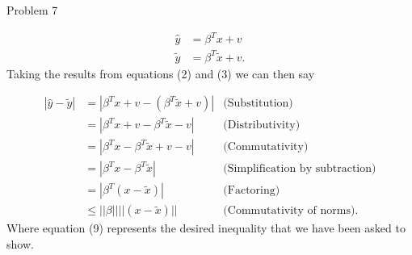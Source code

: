 \begin{problem}{Problem 7}
\begin{Highlight}[Solution]
        \begin{align}
            \hat{y} & = \beta^{T}x + v \\
            \tilde{y} & = \beta^{T}\tilde{x} + v.
        \end{align}
        Taking the results from equations (2) and (3) we can then say 

        \begin{align}
            |\hat{y} - \tilde{y}| & = |\beta^{T}x + v - (\beta^{T}\tilde{x} + v)| & \text{(Substitution)} \\
            & = |\beta^{T}x + v - \beta^{T}\tilde{x} - v| & \text{(Distributivity)} \\
            & = |\beta^{T}x - \beta^{T}\tilde{x} + v - v| & \text{(Commutativity)} \\
            & = |\beta^{T}x - \beta^{T}\tilde{x}| & \text{(Simplification by subtraction)} \\
            & = |\beta^{T}(x - \tilde{x})| & \text{(Factoring)} \\
            & \leq ||\beta||||(x - \tilde{x})|| & \text{(Commutativity of norms)}.
        \end{align}
        Where equation (9) represents the desired inequality that we have been asked to show.
    \end{Highlight}
\end{problem}

